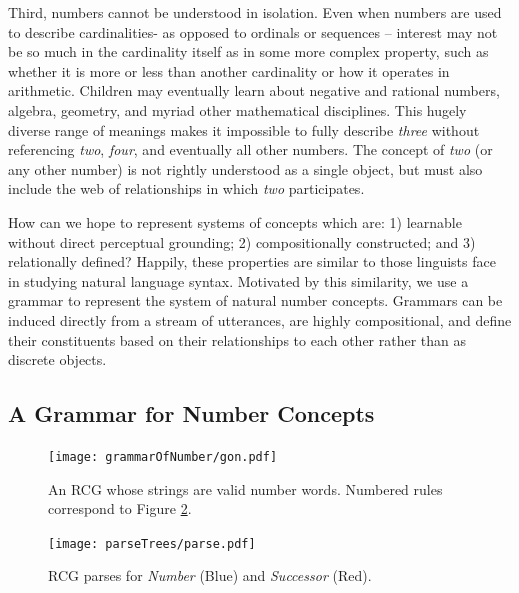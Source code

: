 \documentclass[10pt,letterpaper]{article}
\begin{document}
Third, numbers cannot be understood in isolation. Even when numbers
are used to describe cardinalities- as opposed to ordinals or
sequences -- interest may not be so much in the cardinality itself as
in some more complex property, such as whether it is more or less than
another cardinality or how it operates in arithmetic. Children may
eventually learn about negative and rational numbers, algebra,
geometry, and myriad other mathematical disciplines. This hugely
diverse range of meanings makes it impossible to fully describe
\emph{three} without referencing \emph{two}, \emph{four}, and
eventually all other numbers. The concept of \emph{two} (or any other
number) is not rightly understood as a single object, but must also
include the web of relationships in which \emph{two} participates.

How can we hope to represent systems of concepts which are: 1)
learnable without direct perceptual grounding; 2) compositionally
constructed; and 3) relationally defined? Happily, these properties
are similar to those linguists face in studying natural language
syntax. Motivated by this similarity, we use a grammar to represent
the system of natural number concepts. Grammars can be induced
directly from a stream of utterances, are highly compositional, and
define their constituents based on their relationships to each other
rather than as discrete objects.

\subsection{A Grammar for Number Concepts}

\begin{figure}[t]
  \begin{centering}
    \texttt{[image: grammarOfNumber/gon.pdf]}
    \caption{An RCG whose strings are valid number words. Numbered rules correspond to Figure \ref{fig:parse}.}
    \label{fig:gon}
  \end{centering}
\end{figure}

\begin{figure}[t]
  \begin{centering}
    \texttt{[image: parseTrees/parse.pdf]}
    \caption{RCG parses for \emph{Number} (Blue) and \emph{Successor} (Red).}
    \label{fig:parse}
  \end{centering}
\end{figure}
\end{document}
